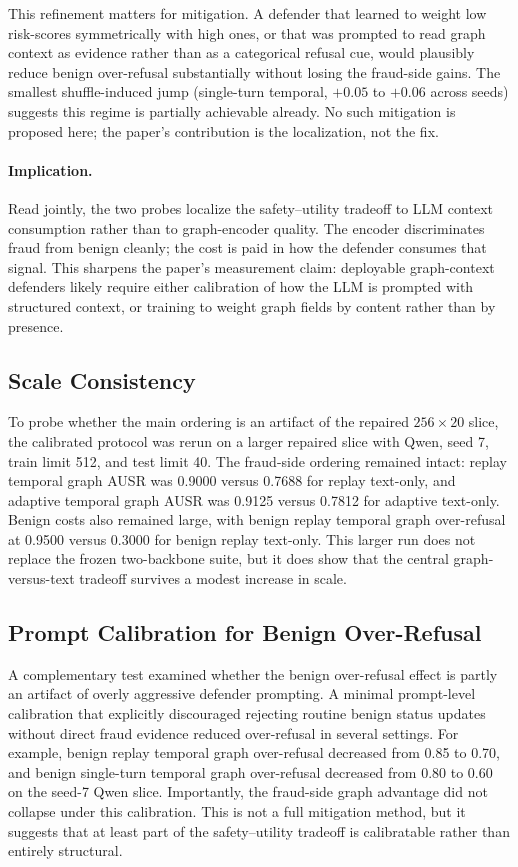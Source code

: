 \documentclass[10pt,letterpaper]{article}
\begin{document}
This refinement matters for mitigation. A defender that learned to weight low risk-scores symmetrically with high ones, or that was prompted to read graph context as evidence rather than as a categorical refusal cue, would plausibly reduce benign over-refusal substantially without losing the fraud-side gains. The smallest shuffle-induced jump (single-turn temporal, $+0.05$ to $+0.06$ across seeds) suggests this regime is partially achievable already. No such mitigation is proposed here; the paper's contribution is the localization, not the fix.

\paragraph{Implication.}
Read jointly, the two probes localize the safety--utility tradeoff to LLM context consumption rather than to graph-encoder quality. The encoder discriminates fraud from benign cleanly; the cost is paid in how the defender consumes that signal. This sharpens the paper's measurement claim: deployable graph-context defenders likely require either calibration of how the LLM is prompted with structured context, or training to weight graph fields by content rather than by presence.

\subsection{Scale Consistency}
To probe whether the main ordering is an artifact of the repaired $256 \times 20$ slice, the calibrated protocol was rerun on a larger repaired slice with Qwen, seed 7, train limit 512, and test limit 40. The fraud-side ordering remained intact: replay temporal graph AUSR was 0.9000 versus 0.7688 for replay text-only, and adaptive temporal graph AUSR was 0.9125 versus 0.7812 for adaptive text-only. Benign costs also remained large, with benign replay temporal graph over-refusal at 0.9500 versus 0.3000 for benign replay text-only. This larger run does not replace the frozen two-backbone suite, but it does show that the central graph-versus-text tradeoff survives a modest increase in scale.

\subsection{Prompt Calibration for Benign Over-Refusal}
A complementary test examined whether the benign over-refusal effect is partly an artifact of overly aggressive defender prompting. A minimal prompt-level calibration that explicitly discouraged rejecting routine benign status updates without direct fraud evidence reduced over-refusal in several settings. For example, benign replay temporal graph over-refusal decreased from 0.85 to 0.70, and benign single-turn temporal graph over-refusal decreased from 0.80 to 0.60 on the seed-7 Qwen slice. Importantly, the fraud-side graph advantage did not collapse under this calibration. This is not a full mitigation method, but it suggests that at least part of the safety--utility tradeoff is calibratable rather than entirely structural.
\end{document}
